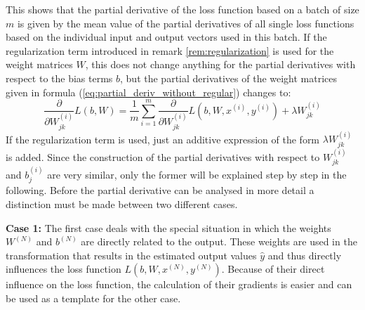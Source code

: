 This shows that the partial derivative of the loss function based on a batch of size $m$ is given by the mean value of the partial derivatives of all single loss functions based on the individual input and output vectors used in this batch. If the regularization term introduced in remark \ref{rem:regularization} is used for the weight matrices $W$, this does not change anything for the partial derivatives with respect to the bias terms $b$, but the partial derivatives of the weight matrices given in formula (\ref{eq:partial_deriv_without_regular}) changes to:
\begin{equation}
		\frac{\partial}{\partial W_{jk}^{(i)}} L(b, W) = \frac{1}{m} \sum_{i = 1}^m \frac{\partial}{\partial W_{jk}^{(i)}} L(b, W, x^{(i)}, y^{(i)}) + \lambda  W_{jk}^{(i)}
\end{equation}
If the regularization term is used, just an additive expression of the form $\lambda W_{jk}^{(i)}$ is added. Since the construction of the partial derivatives with respect to $W_{jk}^{(i)}$ and $b_j^{(i)}$ are very similar, only the former will be explained step by step in the following. Before the partial derivative can be analysed in more detail a distinction must be made between two different cases.

\textbf{Case 1:} The first case deals with the special situation in which the weights $W^{(N)}$ and $b^{(N)}$ are directly related to the output. These weights are used in the transformation that results in the estimated output values $\hat{y}$ and thus directly influences the loss function $L(b, W, x^{(N)}, y^{(N)})$. Because of their direct influence on the loss function, the calculation of their gradients is easier and can be used as a template for the other case.

